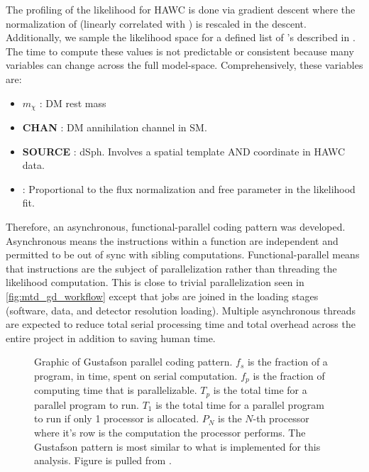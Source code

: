 The profiling of the likelihood for HAWC is done via gradient descent where the normalization of  (linearly correlated with \sv) is rescaled in the descent.
Additionally, we sample the likelihood space for a defined list of \sv's described in .
The time to compute these values is not predictable or consistent because many variables can change across the full model-space.
Comprehensively, these variables are:
\begin{itemize}
    \item $m_\chi$ : DM rest mass
    \item \textbf{CHAN} : DM annihilation channel in SM.
    \item \textbf{SOURCE} : dSph. Involves a spatial template AND coordinate in HAWC data.
    \item \sv: Proportional to the flux normalization and free parameter in the likelihood fit.
\end{itemize}
Therefore, an asynchronous, functional-parallel coding pattern was developed.
Asynchronous means the instructions within a function are independent and permitted to be out of sync with sibling computations.
Functional-parallel means that instructions are the subject of parallelization rather than threading the likelihood computation.
This is close to trivial parallelization seen in \cref{fig:mtd_gd_workflow} except that jobs are joined in the loading stages (software, data, and detector resolution loading).
Multiple asynchronous threads are expected to reduce total serial processing time and total overhead across the entire project in addition to saving human time.

\begin{figure}[h]
    \caption{Graphic of Gustafson parallel coding pattern. $f_s$ is the fraction of a program, in time, spent on serial computation. $f_p$ is the fraction of computing time that is parallelizable. $T_p$ is the total time for a parallel program to run. $T_1$ is the total time for a parallel program to run if only 1 processor is allocated. $P_N$ is the $N$-th processor where it's row is the computation the processor performs. The Gustafson pattern is most similar to what is implemented for this analysis. Figure is pulled from \cite{ArtofHPC}.}
    \label{fig:mtd_gufsta}
\end{figure}

